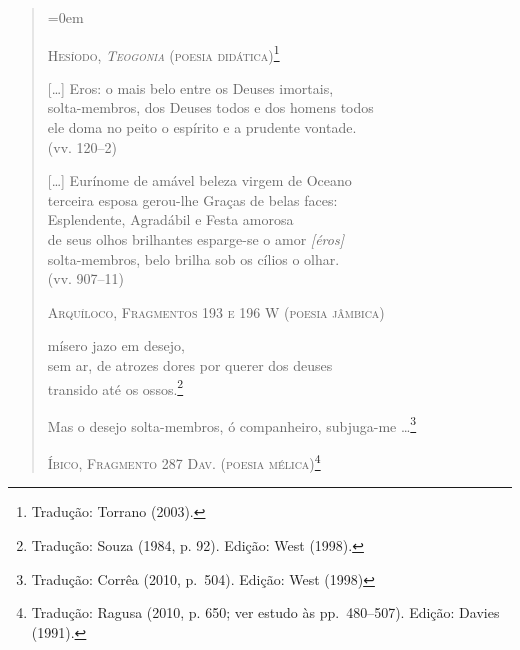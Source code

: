 \begin{quote} \parindent=0em
{\centering
\textsc{Hesíodo, \textit{Teogonia} (poesia didática)\footnote{ Tradução:
Torrano (2003).}}
\par}

\smallskip

	[\ldots{}] Eros: o mais belo entre os Deuses imortais,\\
	solta-membros, dos Deuses todos e dos homens todos\\
	ele doma no peito o espírito e a prudente vontade.\\
	\mbox{}\hfill (vv. 120--2)

\smallskip

	\hspace*{2em}[\ldots{}] Eurínome de amável beleza virgem de Oceano\\
	\hspace*{4.5em}terceira esposa gerou-lhe Graças de belas faces:\\
	\hspace*{4.5em}Esplendente, Agradábil e Festa amorosa\\
	\hspace*{4.5em}de seus olhos brilhantes esparge-se o amor \textit{[éros]}\\
	\hspace*{4.5em}solta-membros, belo brilha sob os cílios o olhar.\\
	\mbox{}\hfill (vv. 907--11)

\bigskip

{\centering
\textsc{Arquíloco, Fragmentos 193 e 196 W (poesia jâmbica)}
\par}

\smallskip

	\hspace*{4.5em}mísero jazo em desejo,\\
	\hspace*{2em}sem ar, de atrozes dores por querer dos deuses\\
	\hspace*{4.5em}transido até os ossos.\footnote{ Tradução: Souza (1984, p. 92). Edição: West (1998).}

\smallskip

	Mas o desejo solta-membros, ó companheiro, subjuga-me
	\ldots{}\footnote{ Tradução: Corrêa (2010, p.~504). Edição: West (1998)}

\bigskip

{\centering
\textsc{Íbico, Fragmento 287 Dav. (poesia mélica)\footnote{ Tradução: Ragusa (2010, p.
650; ver estudo às pp.~480--507). Edição: Davies (1991).}}
\par}


\end{quote}
